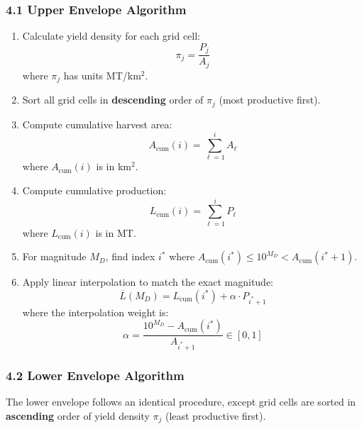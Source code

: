 \documentclass[11pt]{article}
\begin{document}
\subsubsection*{4.1 Upper Envelope Algorithm}
\begin{enumerate}
    \item Calculate yield density for each grid cell: 
    \begin{equation}
    \pi_j = \frac{P_j}{A_j}
    \label{eq:yield_density}
    \end{equation}
    where $\pi_j$ has units MT/km$^2$.
    
    \item Sort all grid cells in \textbf{descending} order of $\pi_j$ (most productive first).
    
    \item Compute cumulative harvest area: 
    \begin{equation}
    A_{\text{cum}}(i) = \sum_{\ell=1}^{i} A_{\ell}
    \label{eq:cum_area}
    \end{equation}
    where $A_{\text{cum}}(i)$ is in km$^2$.
    
    \item Compute cumulative production: 
    \begin{equation}
    L_{\text{cum}}(i) = \sum_{\ell=1}^{i} P_{\ell}
    \label{eq:cum_prod}
    \end{equation}
    where $L_{\text{cum}}(i)$ is in MT.
    
    \item For magnitude $M_D$, find index $i^*$ where $A_{\text{cum}}(i^*) \leq 10^{M_D} < A_{\text{cum}}(i^*+1)$.
    
    \item Apply linear interpolation to match the exact magnitude:
    \begin{equation}
    \overline{L}(M_D) = L_{\text{cum}}(i^*) + \alpha \cdot P_{i^*+1}
    \label{eq:interpolation}
    \end{equation}
    where the interpolation weight is:
    \begin{equation}
    \alpha = \frac{10^{M_D} - A_{\text{cum}}(i^*)}{A_{i^*+1}} \in [0, 1]
    \label{eq:alpha}
    \end{equation}
\end{enumerate}

\subsubsection*{4.2 Lower Envelope Algorithm}
The lower envelope follows an identical procedure, except grid cells are sorted in \textbf{ascending} order of yield density $\pi_j$ (least productive first).
\end{document}
